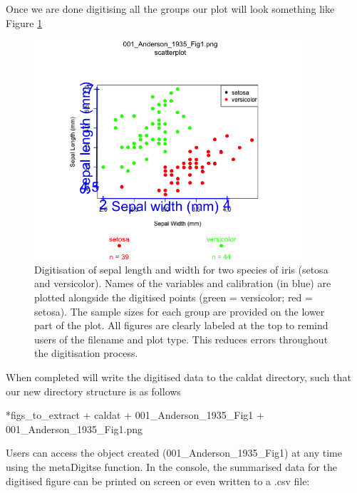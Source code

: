 \documentclass[article]{jss}
\begin{document}
Once we are done digitising all the groups our plot will look something like Figure \ref{fig:scatter_extract}

\begin{figure}[!h] 
 \includegraphics[width=0.9\textwidth]{001_Anderson_1935_Fig1_digitised.png} 
 \caption{Digitisation of sepal length and width for two species of iris (setosa and versicolor). Names of the variables and calibration (in blue) are plotted alongside the digitised points (green = versicolor; red = setosa). The sample sizes for each group are provided on the lower part of the plot. All figures are clearly labeled at the top to remind users of the filename and plot type. This reduces errors throughout the digitisation process.}
\label{fig:scatter_extract}
\end{figure}

When completed  will write the digitised data to the caldat directory, such that our new directory structure is as follows

\begin{CodeChunk}
\begin{CodeOutput}
*figs_to_extract
    + caldat
        + 001_Anderson_1935_Fig1
    + 001_Anderson_1935_Fig1.png
\end{CodeOutput}
\end{CodeChunk}

Users can access the  object created (001\_Anderson\_1935\_Fig1) at any time using the metaDigitse function. In the  console, the summarised data for the digitised figure can be printed on screen or even written to a .csv file:
\end{document}
